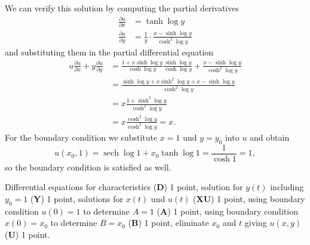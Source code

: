 \begin{loesung}
We can verify this solution by computing the partial derivatives
\begin{align*}
\frac{\partial u}{\partial x}
&=
\tanh\log y
\\
\frac{\partial u}{\partial y}
&=
\frac{1}{y}\cdot
\frac{x-\sinh\log y}{\cosh^2\log y}
\end{align*}
and substituting them in the partial differential equation
\begin{align*}
u\frac{\partial u}{\partial x}
+
y\frac{\partial u}{\partial y}
&=
\frac{1+x\sinh\log y}{\cosh\log y}
\frac{\sinh\log y}{\cosh\log y}
+
\frac{x-\sinh\log y}{\cosh^2\log y}
\\
&=
\frac{
\sinh\log y+x\sinh^2\log y +x-\sinh\log y
}{\cosh^2\log y}
\\
&=
x\frac{1+\sinh^2\log y}{\cosh^2\log y}
\\
&=x\frac{\cosh^2\log y}{\cosh^2\log y} = x.
\end{align*}
For the boundary condition we substitute $x=1$ und $y=y_0$ into
$u$ and obtain
\[
u(x_0,1) = \operatorname{sech}\log 1 + x_0\tanh\log 1 = \frac{1}{\cosh 1}=1,
\]
so the boundary condition is satisfied as well.
\end{loesung}

\begin{bewertung}
Differential equations for characteristics ({\bf D}) 1 point,
solution for $y(t)$ including $y_0=1$ ({\bf Y}) 1 point,
solutions for $x(t)$ und $u(t)$ ({\bf XU}) 1 point,
using boundary condition $u(0)=1$ to determine $A=1$ ({\bf A}) 1 point,
using boundary condition $x(0)=x_0$ to determine $B=x_0$ ({\bf B}) 1 point,
eliminate $x_0$ and $t$ giving $u(x,y)$ ({\bf U}) 1 point.
\end{bewertung}
